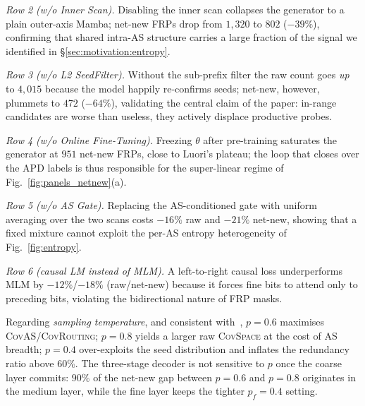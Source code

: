 \documentclass[conference]{IEEEtran}
\begin{document}
\emph{Row 2 (w/o Inner Scan).}  Disabling the inner scan
collapses the generator to a plain outer-axis Mamba; net-new
FRPs drop from $1{,}320$ to $802$ ($-39\%$), confirming that
shared intra-AS structure carries a large fraction of the
signal we identified in \S\ref{sec:motivation:entropy}.

\emph{Row 3 (w/o L2 SeedFilter).}  Without the sub-prefix filter
the raw count goes \emph{up} to $4{,}015$ because the model
happily re-confirms seeds; net-new, however, plummets to $472$
($-64\%$), validating the central claim of the paper: in-range
candidates are worse than useless, they actively displace
productive probes.

\emph{Row 4 (w/o Online Fine-Tuning).}  Freezing $\theta$ after
pre-training saturates the generator at $951$ net-new FRPs,
close to Luori's plateau; the loop that closes over the APD
labels is thus responsible for the super-linear regime of
Fig.~\ref{fig:panels_netnew}(a).

\emph{Row 5 (w/o AS Gate).}  Replacing the AS-conditioned gate
with uniform averaging over the two scans costs $-16\%$ raw and
$-21\%$ net-new, showing that a fixed mixture cannot exploit
the per-AS entropy heterogeneity of Fig.~\ref{fig:entropy}.

\emph{Row 6 (causal LM instead of MLM).}  A left-to-right
causal loss underperforms MLM by $-12\%$/$-18\%$ (raw/net-new)
because it forces fine bits to attend only to preceding bits,
violating the bidirectional nature of FRP masks.

Regarding \emph{sampling temperature}, and consistent
with~\cite{wei2025gungnir}, $p{=}0.6$ maximises
\textsc{CovAS}/\textsc{CovRouting}; $p{=}0.8$ yields a larger
raw \textsc{CovSpace} at the cost of AS breadth; $p{=}0.4$
over-exploits the seed distribution and inflates the redundancy
ratio above $60\%$.  The three-stage decoder is not sensitive
to $p$ once the coarse layer commits: $90\%$ of the net-new gap
between $p{=}0.6$ and $p{=}0.8$ originates in the medium layer,
while the fine layer keeps the tighter $p_f{=}0.4$ setting.
\end{document}
